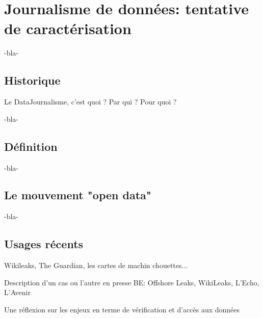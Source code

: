 
\chapter{Journalisme de données: tentative de caractérisation}


-bla-

\section{Historique}

Le DataJournalisme, c'est quoi ? Par qui ? Pour quoi ?

-bla-

\section{Définition}

-bla-

\section{Le mouvement "open data"}

-bla-

\section{Usages récents}

Wikileaks, The Guardian, les cartes de machin chouettes...


Description d'un cas ou l'autre en presse BE: Offshore Leaks, WikiLeaks, L'Echo, L'Avenir

Une réflexion sur les enjeux en terme de vérification et d'accès aux données

